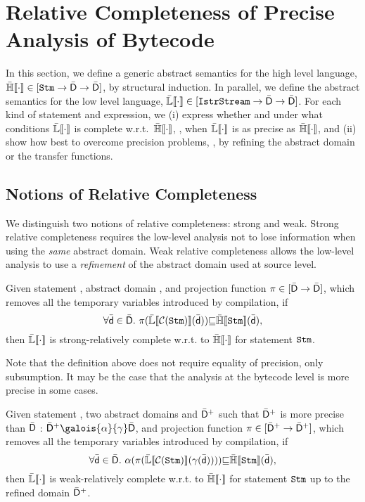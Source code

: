 \documentclass{llncs}
\begin{document}
\section{Relative Completeness of Precise Analysis of Bytecode}
In this section, we define a generic abstract semantics for the high
level language, $\mathbb{\bar{H}}\llbracket \mathtt{\cdot} \rrbracket \in [\mathtt{Stm} \rightarrow\bar{\mathsf{D}}
\rightarrow \bar{\mathsf{D}}]$, by structural induction.  In parallel, we
define the abstract semantics for the low level language,
$\mathbb{\bar{L}}\llbracket \mathtt{\cdot} \rrbracket \in [\mathtt{IstrStream} \rightarrow\bar{\mathsf{D}} \rightarrow
  \bar{\mathsf{D}}]$. For each kind of statement and expression, we
(i) express whether and under what conditions
$\mathbb{\bar{L}}\llbracket \mathtt{\cdot} \rrbracket$  is complete w.r.t.\  $\mathbb{\bar{H}}\llbracket \mathtt{\cdot} \rrbracket$, \ie, when
$\mathbb{\bar{L}}\llbracket \mathtt{\cdot} \rrbracket$ is as precise as $\mathbb{\bar{H}}\llbracket \mathtt{\cdot} \rrbracket$, and (ii) show
how best to overcome precision problems, \eg, by refining the abstract domain or
the transfer functions.

\subsection{Notions of Relative Completeness}
We distinguish two notions of relative completeness: strong and
weak.   Strong relative completeness requires the low-level
analysis not to lose information when using the \emph{same} abstract domain.
Weak relative completeness allows the low-level analysis to use a
\emph{refinement} of the abstract domain used at source level.

\begin{definition}
Given statement \Stm, abstract domain , and projection
function $\pi \in [\bar{\mathsf{D}} \rightarrow\bar{\mathsf{D}}]$, which removes all
the temporary variables introduced by compilation, if
\begin{equation}
\forall \ael{d} \in \adom{D}.\ \pi(\LLSem{\Comp(\Stm)}(\ael{d})) \aless \HLSem{\Stm}(\ael{d}),
\label{eq:completeness}
\end{equation}
 then $\mathbb{\bar{L}}\llbracket \mathtt{\cdot} \rrbracket$ is strong-relatively complete w.r.t. to $\mathbb{\bar{H}}\llbracket \mathtt{\cdot} \rrbracket$ for statement $\mathtt{Stm}$.
\end{definition}

Note that the definition above does not require equality of precision,
only subsumption. It may be the case that the analysis at the bytecode
level is more precise in some cases.

\begin{definition}
Given statement \Stm, two abstract domains  and $\bar{\mathsf{D}}^+$
such that $\bar{\mathsf{D}}^+$ is more precise than $\bar{\mathsf{D}}$ : $\adom{D}^+
\galois{\alpha}{\gamma} \adom{D}$, and projection function $\pi \in
[\bar{\mathsf{D}}^+ \rightarrow\bar{\mathsf{D}}^+]$, which removes all the temporary
variables introduced by compilation, if
\begin{equation}
\forall \bar{\mathsf{d}} \in \bar{\mathsf{D}}.\ \alpha (\pi (\mathbb{\bar{L}}\llbracket \mathtt{\mathcal{C}(\mathtt{Stm})} \rrbracket(\gamma(\bar{\mathsf{d}})))) {\sqsubseteq} \mathbb{\bar{H}}\llbracket \mathtt{\mathtt{Stm}} \rrbracket(\bar{\mathsf{d}}),
\label{eq:weakcompleteness}
\end{equation}
 then  $\mathbb{\bar{L}}\llbracket \mathtt{\cdot} \rrbracket$ is weak-relatively complete
 w.r.t. to $\mathbb{\bar{H}}\llbracket \mathtt{\cdot} \rrbracket$ for statement $\mathtt{Stm}$ up to the refined
 domain $\bar{\mathsf{D}}^+$.
\end{definition}
\end{document}
